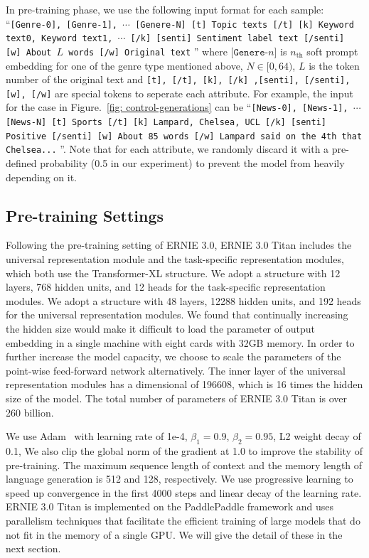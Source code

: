 In pre-training phase, we use the following input format for each sample:  ``\texttt{[Genre-0], [Genre-1], $\cdots$ [Genere-N] [t] Topic texts [/t] [k] Keyword text0, Keyword text1, $\cdots$ [/k] [senti] Sentiment label text [/senti] [w] About $L$ words [/w] Original text} '' where $\texttt{[Genere-$n$]}$ is $n_{\text{th}}$ soft prompt embedding for one of the genre type mentioned above, $N \in [0, 64)$, $L$ is the token number of the original text and \texttt{[t], [/t], [k], [/k] ,[senti], [/senti], [w], [/w]} are special tokens to seperate each attribute. For example, the input for the case in Figure.~\ref{fig: control-generations} can be ``\texttt{[News-0], [News-1], $\cdots$ [News-N] [t] Sports [/t] [k] Lampard, Chelsea, UCL [/k] [senti] Positive [/senti] [w] About 85 words [/w] Lampard said on the 4th that Chelsea...} ''. Note that for each attribute, we randomly discard it with a pre-defined probability (0.5 in our experiment) to prevent the model from heavily depending on it.

\subsection{Pre-training Settings} \label{pretraining_setting}
Following the pre-training setting of ERNIE 3.0, ERNIE 3.0 Titan includes the universal representation module and the task-specific representation modules, which both use the Transformer-XL structure. We adopt a structure with 12 layers, 768 hidden units, and 12 heads for the task-specific representation modules. We adopt a structure with 48 layers, 12288 hidden units, and 192 heads for the universal representation modules. We found that continually increasing the hidden size would make it difficult to load the parameter of output embedding in a single machine with eight cards with 32GB memory. In order to further increase the model capacity, we choose to scale the parameters of the point-wise feed-forward network alternatively. The inner layer of the universal representation modules has a dimensional of 196608, which is 16 times the hidden size of the model. The total number of parameters of ERNIE 3.0 Titan is over 260 billion.

We use Adam~\cite{kingma2014adam} with learning rate of 1e-4, $\beta_1=0.9$, $\beta_2=0.95$, L2 weight decay of 0.1, We also clip the global norm of the gradient at 1.0 to improve the stability of pre-training. The maximum sequence length of context and the memory length of language generation is 512 and 128, respectively. We use progressive learning to speed up convergence in the first 4000 steps and linear decay of the learning rate. ERNIE 3.0 Titan is implemented on the PaddlePaddle framework and uses parallelism techniques that facilitate the efficient training of large models that do not fit in the memory of a single GPU. We will give the detail of these in the next section.

